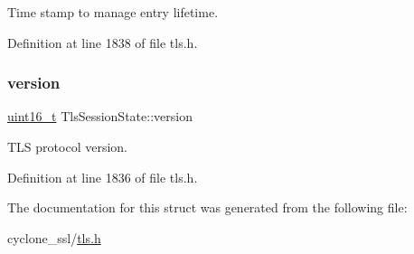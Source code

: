 Time stamp to manage entry lifetime. 



Definition at line 1838 of file tls.\+h.

\mbox{\label{structTlsSessionState_a174320f3867df007a4315bfa7a84e42c}} 
\subsubsection{\texorpdfstring{version}{version}}
{\footnotesize\ttfamily \hyperlink{stdint_8h_a273cf69d639a59973b6019625df33e30}{uint16\+\_\+t} Tls\+Session\+State\+::version}



T\+LS protocol version. 



Definition at line 1836 of file tls.\+h.



The documentation for this struct was generated from the following file\+:\begin{DoxyCompactItemize}
\item 
cyclone\+\_\+ssl/\hyperlink{tls_8h}{tls.\+h}\end{DoxyCompactItemize}
